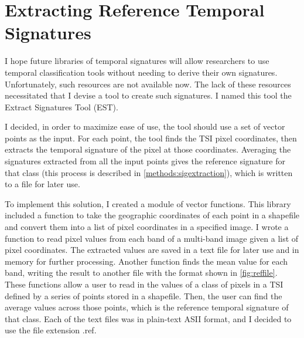 \section{Extracting Reference Temporal Signatures}
\label{appendix:tools:extract}

I hope future libraries of temporal signatures will allow researchers to use temporal classification tools without needing to derive their own signatures. Unfortunately, such resources are not available now. The lack of these resources necessitated that I devise a tool to create such signatures. I named this tool the Extract Signatures Tool (EST).

I decided, in order to maximize ease of use, the tool should use a set of vector points as the input. For each point, the tool finds the TSI pixel coordinates, then extracts the temporal signature of the pixel at those coordinates. Averaging the signatures extracted from all the input points gives the reference signature for that class (this process is described in \autoref{methods:sigextraction}), which is written to a file for later use.

To implement this solution, I created a module of vector functions. This library included a function to take the geographic coordinates of each point in a shapefile and convert them into a list of pixel coordinates in a specified image. I wrote a function to read pixel values from each band of a multi-band image given a list of pixel coordinates. The extracted values are saved in a text file for later use and in memory for further processing. Another function finds the mean value for each band, writing the result to another file with the format shown in \autoref{fig:reffile}. These functions allow a user to read in the values of a class of pixels in a TSI defined by a series of points stored in a shapefile. Then, the user can find the average values across those points, which is the reference temporal signature of that class. Each of the text files was in plain-text ASII format, and I decided to use the file extension .ref.

